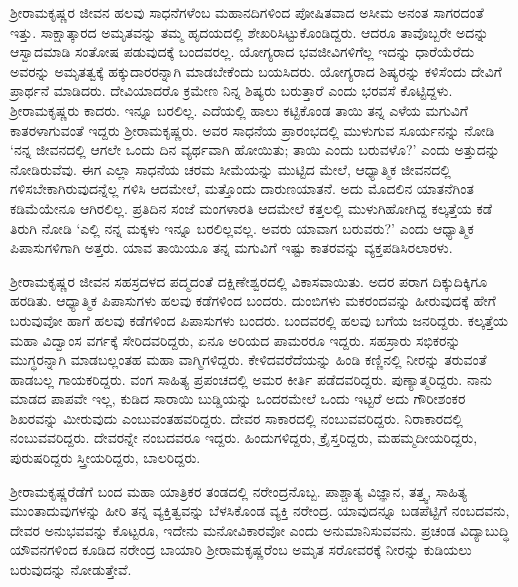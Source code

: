 ಶ‍್ರೀರಾಮಕೃಷ್ಣರ ಜೀವನ ಹಲವು ಸಾಧನೆಗಳೆಂಬ ಮಹಾನದಿಗಳಿಂದ ಪೋಷಿತವಾದ ಅಸೀಮ ಅನಂತ ಸಾಗರದಂತೆ ಇತ್ತು. ಸಾಕ್ಷಾತ್ಕಾರದ ಅಮೃತವನ್ನು ತಮ್ಮ ಹೃದಯದಲ್ಲಿ ಶೇಖರಿಸಿಟ್ಟುಕೊಂಡಿದ್ದರು. ಆದರೂ ತಾವೊಬ್ಬರೇ ಅದನ್ನು ಆಸ್ವಾದಮಾಡಿ ಸಂತೋಷ ಪಡುವುದಕ್ಕೆ ಬಂದವರಲ್ಲ. ಯೋಗ್ಯರಾದ ಭವಜೀವಿಗಳಿಗೆಲ್ಲ ಇದನ್ನು ಧಾರೆಯೆರೆದು ಅವರನ್ನು ಅಮೃತತ್ವಕ್ಕೆ ಹಕ್ಕುದಾರರನ್ನಾಗಿ ಮಾಡಬೇಕೆಂದು ಬಯಸಿದರು. ಯೋಗ್ಯರಾದ ಶಿಷ್ಯರನ್ನು ಕಳಿಸೆಂದು ದೇವಿಗೆ ಪ್ರಾರ್ಥನೆ ಮಾಡಿದರು. ದೇವಿಯಾದರೊ ಕ್ರಮೇಣ ನಿನ್ನ ಶಿಷ್ಯರು ಬರುತ್ತಾರೆ ಎಂದು ಭರವಸೆ ಕೊಟ್ಟಿದ್ದಳು. ಶ‍್ರೀರಾಮಕೃಷ್ಣರು ಕಾದರು. ಇನ್ನೂ ಬರಲಿಲ್ಲ. ಎದೆಯಲ್ಲಿ ಹಾಲು ಕಟ್ಟಿಕೊಂಡ ತಾಯಿ ತನ್ನ ಎಳೆಯ ಮಗುವಿಗೆ ಕಾತರಳಾಗುವಂತೆ ಇದ್ದರು ಶ‍್ರೀರಾಮಕೃಷ್ಣರು. ಅವರ ಸಾಧನೆಯ ಪ್ರಾರಂಭದಲ್ಲಿ ಮುಳುಗುವ ಸೂರ್ಯನನ್ನು ನೋಡಿ ‘ನನ್ನ ಜೀವನದಲ್ಲಿ ಆಗಲೇ ಒಂದು ದಿನ ವ್ಯರ್ಥವಾಗಿ ಹೋಯಿತು; ತಾಯಿ ಎಂದು ಬರುವಳೊ?’ ಎಂದು ಅತ್ತುದನ್ನು ನೋಡಿರುವೆವು. ಈಗ ಎಲ್ಲಾ ಸಾಧನೆಯ ಚರಮ ಸೀಮೆಯನ್ನು ಮುಟ್ಟಿದ ಮೇಲೆ, ಆಧ್ಯಾತ್ಮಿಕ ಜೀವನದಲ್ಲಿ ಗಳಿಸಬೇಕಾಗಿರುವುದನ್ನೆಲ್ಲ ಗಳಿಸಿ ಆದಮೇಲೆ, ಮತ್ತೊಂದು ದಾರುಣಯಾತನೆ. ಅದು ಮೊದಲಿನ ಯಾತನೆಗಿಂತ ಕಡಿಮೆಯೇನೂ ಆಗಿರಲಿಲ್ಲ. ಪ್ರತಿದಿನ ಸಂಜೆ ಮಂಗಳಾರತಿ ಆದಮೇಲೆ ಕತ್ತಲಲ್ಲಿ ಮುಳುಗಿಹೋಗಿದ್ದ ಕಲ್ಕತ್ತೆಯ ಕಡೆ ತಿರುಗಿ ನೋಡಿ ‘ಎಲ್ಲಿ ನನ್ನ ಮಕ್ಕಳು ಇನ್ನೂ ಬರಲಿಲ್ಲವಲ್ಲ. ಅವರು ಯಾವಾಗ ಬರುವರು?’ ಎಂದು ಆಧ್ಯಾತ್ಮಿಕ ಪಿಪಾಸುಗಳಿಗಾಗಿ ಅತ್ತರು. ಯಾವ ತಾಯಿಯೂ ತನ್ನ ಮಗುವಿಗೆ ಇಷ್ಟು ಕಾತರವನ್ನು ವ್ಯಕ್ತಪಡಿಸಿರಲಾರಳು.

ಶ‍್ರೀರಾಮಕೃಷ್ಣರ ಜೀವನ ಸಹಸ್ರದಳದ ಪದ್ಮದಂತೆ ದಕ್ಷಿಣೇಶ್ವರದಲ್ಲಿ ವಿಕಾಸವಾಯಿತು. ಅದರ ಪರಾಗ ದಿಕ್ಕುದಿಕ್ಕಿಗೂ ಹರಡಿತು. ಆಧ್ಯಾತ್ಮಿಕ ಪಿಪಾಸುಗಳು ಹಲವು ಕಡೆಗಳಿಂದ ಬಂದರು. ದುಂಬಿಗಳು ಮಕರಂದವನ್ನು ಹೀರುವುದಕ್ಕೆ ಹೇಗೆ ಬರುವುವೋ ಹಾಗೆ ಹಲವು ಕಡೆಗಳಿಂದ ಪಿಪಾಸುಗಳು ಬಂದರು. ಬಂದವರಲ್ಲಿ ಹಲವು ಬಗೆಯ ಜನರಿದ್ದರು. ಕಲ್ಕತ್ತೆಯ ಮಹಾ ವಿದ್ವಾಂಸ ವರ್ಗಕ್ಕೆ ಸೇರಿದವರಿದ್ದರು, ಏನೂ ಅರಿಯದ ಪಾಮರರೂ ಇದ್ದರು. ಸಹಸ್ರಾರು ಸಭಿಕರನ್ನು ಮುಗ್ಧರನ್ನಾಗಿ ಮಾಡಬಲ್ಲಂತಹ ಮಹಾ ವಾಗ್ಮಿಗಳಿದ್ದರು. ಕೇಳಿದವರೆದೆಯನ್ನು ಹಿಂಡಿ ಕಣ್ಣಿನಲ್ಲಿ ನೀರನ್ನು ತರುವಂತೆ ಹಾಡಬಲ್ಲ ಗಾಯಕರಿದ್ದರು. ವಂಗ ಸಾಹಿತ್ಯ ಪ್ರಪಂಚದಲ್ಲಿ ಅಮರ ಕೀರ್ತಿ ಪಡೆದವರಿದ್ದರು. ಪುಣ್ಯಾತ್ಮರಿದ್ದರು. ನಾನು ಮಾಡದ ಪಾಪವೇ ಇಲ್ಲ, ಕುಡಿದ ಸಾರಾಯಿ ಬುಡ್ಡಿಯನ್ನು ಒಂದರಮೇಲೆ ಒಂದು ಇಟ್ಟರೆ ಅದು ಗೌರೀಶಂಕರ ಶಿಖರವನ್ನು ಮೀರುವುದು ಎಂಬುವಂತಹವರಿದ್ದರು. ದೇವರ ಸಾಕಾರದಲ್ಲಿ ನಂಬುವವರಿದ್ದರು. ನಿರಾಕಾರದಲ್ಲಿ ನಂಬುವವರಿದ್ದರು. ದೇವರನ್ನೇ ನಂಬದವರೂ ಇದ್ದರು. ಹಿಂದುಗಳಿದ್ದರು, ಕ್ರೈಸ್ತರಿದ್ದರು, ಮಹಮ್ಮದೀಯರಿದ್ದರು, ಪುರುಷರಿದ್ದರು ಸ್ತ್ರೀಯರಿದ್ದರು, ಬಾಲರಿದ್ದರು.

ಶ‍್ರೀರಾಮಕೃಷ್ಣರೆಡೆಗೆ ಬಂದ ಮಹಾ ಯಾತ್ರಿಕರ ತಂಡದಲ್ಲಿ ನರೇಂದ್ರನೊಬ್ಬ. ಪಾಶ್ಚಾತ್ಯ ವಿಜ್ಞಾನ, ತತ್ತ್ವ, ಸಾಹಿತ್ಯ ಮುಂತಾದುವುಗಳನ್ನು ಹೀರಿ ತನ್ನ ವ್ಯಕ್ತಿತ್ವವನ್ನು ಬೆಳಸಿಕೊಂಡ ವ್ಯಕ್ತಿ ನರೇಂದ್ರ. ಯಾವುದನ್ನೂ ಬಡಪೆಟ್ಟಿಗೆ ನಂಬದವನು, ದೇವರ ಅನುಭವವನ್ನು ಕೊಟ್ಟರೂ, ಇದೇನು ಮನೋವಿಕಾರವೋ ಎಂದು ಅನುಮಾನಿಸುವವನು. ಪ್ರಚಂಡ ವಿದ್ಯಾಬುದ್ಧಿ ಯೌವನಗಳಿಂದ ಕೂಡಿದ ನರೇಂದ್ರ ಬಾಯಾರಿ ಶ‍್ರೀರಾಮಕೃಷ್ಣರೆಂಬ ಅಮೃತ ಸರೋವರಕ್ಕೆ ನೀರನ್ನು ಕುಡಿಯಲು ಬರುವುದನ್ನು ನೋಡುತ್ತೇವೆ.

